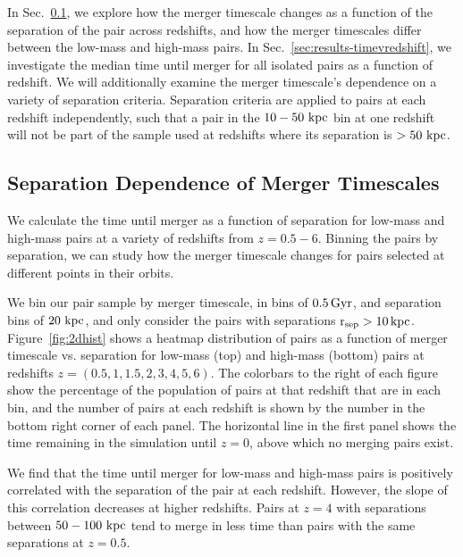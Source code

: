 \documentclass[twocolumn,linenumbers]{aastex631}
\begin{document}
    In Sec.~\ref{sec:results-timevsep}, we explore how the merger timescale changes as a function of the separation of the pair across redshifts, and how the merger timescales differ between the low-mass and high-mass pairs. 
    In Sec.~\ref{sec:results-timevredshift}, we investigate the median time until merger for all isolated pairs as a function of redshift. 
    We will additionally examine the merger timescale's dependence on a variety of separation criteria. 
    Separation criteria are applied to pairs at each redshift independently, such that a pair in the $10-50\,\mathrm{\,kpc}$ bin at one redshift will not be part of the sample used at redshifts where its separation is $>50\,\mathrm{\,kpc}$.



\subsection{Separation Dependence of Merger Timescales}\label{sec:results-timevsep}
    We calculate the time until merger as a function of separation for low-mass and high-mass pairs at a variety of redshifts from $z=0.5-6$. 
    Binning the pairs by separation, we can study how the merger timescale changes for pairs selected at different points in their orbits. 
    
    We bin our pair sample by merger timescale, in bins of $0.5\mathrm{\,Gyr}$, and separation bins of $20\,\mathrm{\,kpc}$, and only consider the pairs with separations $\rm r_{sep}>10\mathrm{\,kpc}$.
    Figure~\ref{fig:2dhist} shows a heatmap distribution of pairs as a function of merger timescale vs. separation for low-mass (top) and high-mass (bottom) pairs at redshifts $z=(0.5,1,1.5,2,3,4,5,6)$. 
    The colorbars to the right of each figure show the percentage of the population of pairs at that redshift that are in each bin, and the number of pairs at each redshift is shown by the number in the bottom right corner of each panel.
    The horizontal line in the first panel shows the time remaining in the simulation until $z=0$, above which no merging pairs exist.
    
    We find that the time until merger for low-mass and high-mass pairs is positively correlated with the separation of the pair at each redshift. 
    However, the slope of this correlation decreases at higher redshifts.
    Pairs at $z=4$ with separations between $50-100\,\mathrm{\,kpc}$ tend to merge in less time than pairs with the same separations at $z=0.5$. 
    
\end{document}
